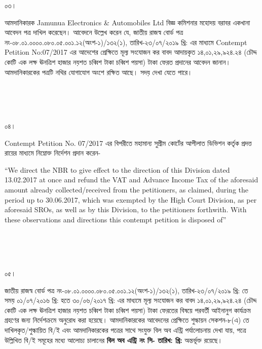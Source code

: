 \documentclass[12pt]{article}
\newcommand{\nbrl}{নং-০৮.০১.০০০০.০৮০.০৫.০০১.১২(অংশ-১)/১৩২(১), তারিখ-২৩/০৭/২০১৯ খ্রি:}
\newcommand{\nbrl}{নং-০৮.০১.০০০০.০৮০.০৫.০০১.১২(অংশ-১)/১৩২(২), তারিখ-২৩/০৭/২০১৯ খ্রি:}
\newcommand{\nbrl}{নং-০৮.০১.০০০০.০৮০.০৫.০০১.১২(অংশ-১)/১৭২, তারিখ-১৭/১১/২০১৯ খ্রি:}
\newcommand{\tvat}{১৪,০১,২৯,৯২৪.২৪ (চৌদ্দ কোটি এক লক্ষ ঊনত্রিশ হাজার নয়শত চব্বিশ টাকা চব্বিশ পয়সা) টাকা}
\newcommand{\tvat}{২,১৩,৯৫,৯৪০.৩৩ (দু্ই কোটি তের লক্ষ পঁচানব্বই হাজার নয়শত চল্লিশ টাকা তেত্রিশ পয়সা) টাকা}
\newcommand{\tl}{০১/০৭/২০১৬ খ্রি: হতে ৩০/০৬/২০১৭ খ্রি:}
\newcommand{\tl}{০৬/০৬/২০১৭ খ্রি: হতে ৩০/০৬/২০১৭ খ্রি:}
\newcommand{\cno}{}
\newcommand{\dt}{}
\begin{document}
\begin{minipage}[t]{0.05\linewidth}
০৩।
\end{minipage}
\begin{minipage}[t]{1\linewidth}
আমদানিকারক
Jamunua Electronics \& Automobiles Ltd
বিজ্ঞ কমিশনার মহোদয় বরাবর
একখানা আবেদন পত্র দাখিল
করেছেন। আবেদনে উল্লেখ করেন যে,
জাতীয় রাজস্ব বোর্ড পত্র
{\nbrl} এর মাধ্যমে
Contempt Petition No:07/2017
এর আদেশের প্রেক্ষিতে মূল্য সংযোজন কর
বাবদ আদায়কৃত
{\tvat} ফেরত প্রদানের আবেদন জানান।
আমদানিকারকের পত্রটি নথির যোগাযোগ
অংশে রক্ষিত আছে।
সদয় দেখা যেতে পারে।
\end{minipage}
\\
\\
\\
\begin{minipage}[t]{0.05\linewidth}
০৪।
\end{minipage}
\begin{minipage}[t]{1\linewidth}
Contempt Petition No. 07/2017
এর বিপরীতে মহামান্য সুপ্রীম কোর্টের
আপীলাত ডিভিশন কর্তৃক প্রদত্ত রায়ের
মাধ্যমে নিম্নোক্ত নির্দেশন প্রদান করেন-


\hspace{1em}``We direct the NBR
to give effect to the direction
of this Division
dated 13.02.2017
at once and refund the VAT
and Advance Income Tax
of the aforesaid amount already
collected/received from the
petitioners, as claimed, during
the period up to 30.06.2017,
which was exempted by the
High Court Division, as per
aforesaid SROs, as well as by this
Division, to the  petitioners
forthwith. With these observations
and directions this contempt
petition is disposed of''
\end{minipage}
\\
\\
\\
\begin{minipage}[t]{0.05\linewidth}
০৫।
\end{minipage}
\begin{minipage}[t]{1\linewidth}
জাতীয় রাজস্ব বোর্ড পত্র
{\nbrl} তে সময়
{\tl} এর মাধ্যমে মূল্য সংযোজন কর বাবদ
{\tvat} ফেরতের বিষয়ে পরবর্তী
আইনানুগ কার্যক্রম গ্রহণের জন্য
নির্দেশক্রমে অনুরোধ করা হয়েছে।
আমদানিকারকের আবেদনের প্রেক্ষিতে শুল্কায়ন
সেকশন-৮(এ) তে দাখিলকৃত/শুল্কায়িত
বি/ই এবং আমদানিকারকের
পত্রের সাথে সংযুক্ত বিল অব এন্ট্রি
পর্যালোচনায় দেখা যায়,
পত্রে উল্লিখিত বি/ই সমূহের
মধ্যে আলোচ্য চালানের
\textbf{বিল অব এন্ট্রি নং সি-{\cno} তারিখ: {\dt} খ্রি:} অন্তর্ভূক্ত রয়েছে।
\end{minipage}
\end{document}
